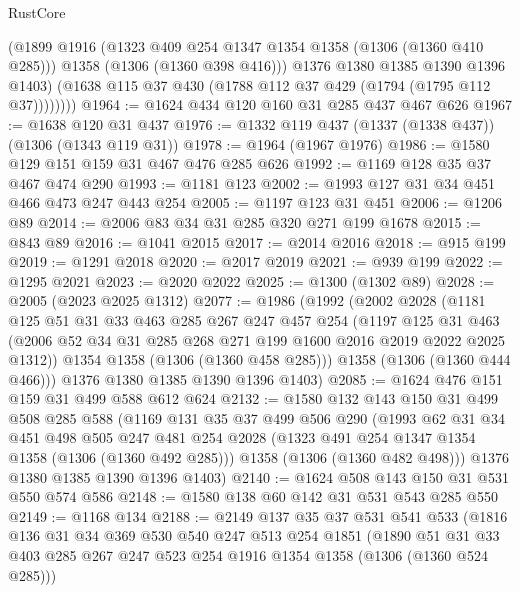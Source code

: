 \begin{lexlean}{RustCore}
\begin{coremodule}
              (@1899
                @1916
                (@1323 @409 @254 @1347 @1354 @1358 (@1306 (@1360 @410 @285)))
                @1358
                (@1306 (@1360 @398 @416)))
              @1376
              @1380
              @1385
              @1390
              @1396
              @1403)
            (@1638 @115 @37 @430 (@1788 @112 @37 @429 (@1794 (@1795 @112 @37))))))))
@1964 := @1624 @434 @120 @160 @31 @285 @437 @467 @626
@1967 := @1638 @120 @31 @437
@1976 := @1332 @119 @437 (@1337 (@1338 @437)) (@1306 (@1343 @119 @31))
@1978 := @1964 (@1967 @1976)
@1986 := @1580 @129 @151 @159 @31 @467 @476 @285 @626
@1992 := @1169 @128 @35 @37 @467 @474 @290
@1993 := @1181 @123
@2002 := @1993 @127 @31 @34 @451 @466 @473 @247 @443 @254
@2005 := @1197 @123 @31 @451
@2006 := @1206 @89
@2014 := @2006 @83 @34 @31 @285 @320 @271 @199 @1678
@2015 := @843 @89
@2016 := @1041 @2015
@2017 := @2014 @2016
@2018 := @915 @199
@2019 := @1291 @2018
@2020 := @2017 @2019
@2021 := @939 @199
@2022 := @1295 @2021
@2023 := @2020 @2022
@2025 := @1300 (@1302 @89)
@2028 := @2005 (@2023 @2025 @1312)
@2077 := @1986
    (@1992
      (@2002
        @2028
        (@1181
          @125
          @51
          @31
          @33
          @463
          @285
          @267
          @247
          @457
          @254
          (@1197
            @125
            @31
            @463
            (@2006 @52 @34 @31 @285 @268 @271 @199 @1600 @2016 @2019 @2022 @2025 @1312))
          @1354
          @1358
          (@1306 (@1360 @458 @285)))
        @1358
        (@1306 (@1360 @444 @466)))
      @1376
      @1380
      @1385
      @1390
      @1396
      @1403)
@2085 := @1624 @476 @151 @159 @31 @499 @588 @612 @624
@2132 := @1580
    @132
    @143
    @150
    @31
    @499
    @508
    @285
    @588
    (@1169
      @131
      @35
      @37
      @499
      @506
      @290
      (@1993
        @62
        @31
        @34
        @451
        @498
        @505
        @247
        @481
        @254
        @2028
        (@1323 @491 @254 @1347 @1354 @1358 (@1306 (@1360 @492 @285)))
        @1358
        (@1306 (@1360 @482 @498)))
      @1376
      @1380
      @1385
      @1390
      @1396
      @1403)
@2140 := @1624 @508 @143 @150 @31 @531 @550 @574 @586
@2148 := @1580 @138 @60 @142 @31 @531 @543 @285 @550
@2149 := @1168 @134
@2188 := @2149
    @137
    @35
    @37
    @531
    @541
    @533
    (@1816
      @136
      @31
      @34
      @369
      @530
      @540
      @247
      @513
      @254
      @1851
      (@1890 @51 @31 @33 @403 @285 @267 @247 @523 @254 @1916 @1354 @1358 (@1306 (@1360 @524 @285)))

\end{coremodule}
\end{lexlean}
